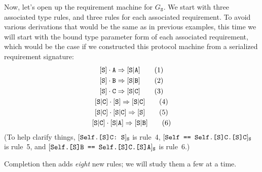 \documentclass[../generics]{subfiles}
\begin{document}
\begin{example}
Now, let's open up the requirement machine for $G_{\texttt{S}}$. We start with three associated type rules, and three rules for each associated requirement. To avoid various derivations that would be the same as in previous examples, this time we will start with the bound type parameter form of each associated requirement, which would be the case if we constructed this protocol machine from a serialized requirement signature:
\begin{gather*}
\AssocIntro{S}{A}\tag{1}\\
\AssocIntro{S}{B}\tag{2}\\
\AssocIntro{S}{C}\tag{3}\\
\ProtoConf{\assocsym{S}{C}}{S}\tag{4}\\
\assocsym{S}{C}\cdot\assocsym{S}{C}\Red\protosym{S}\tag{5}\\
\assocsym{S}{C}\cdot\assocsym{S}{A}\Red\assocsym{S}{B}\tag{6}
\end{gather*}
(To help clarify things, $[\texttt{Self.[S]C:~S}]_{\texttt{S}}$ is rule~4, $[\texttt{Self == Self.[S]C.[S]C}]_{\texttt{S}}$ is rule~5, and $[\texttt{Self.[S]B == Self.[S]C.[S]A}]_{\texttt{S}}$ is rule~6.)

Completion then adds \emph{eight} new rules; we will study them a few at a time.


\end{example}
\end{document}
